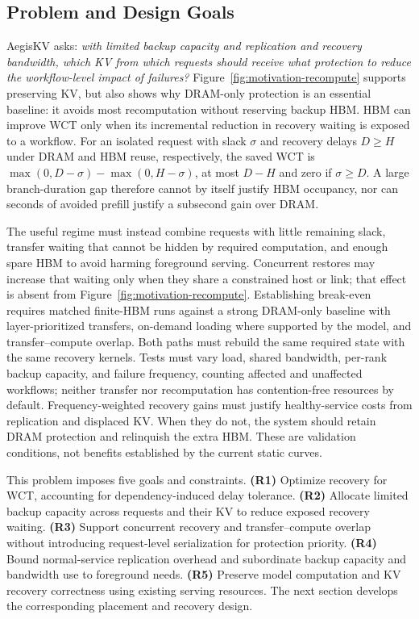 \subsection{Problem and Design Goals}
\label{sec:motivation-goals}

AegisKV asks: \emph{with limited backup capacity and replication and
recovery bandwidth, which KV from which requests should receive what
protection to reduce the workflow-level impact of failures?}
Figure~\ref{fig:motivation-recompute} supports preserving KV, but also
shows why DRAM-only protection is an essential baseline: it avoids most
recomputation without reserving backup HBM. HBM can improve WCT only when
its incremental reduction in recovery waiting is exposed to a workflow.
For an isolated request with slack $\sigma$ and recovery delays
$D\geq H$ under DRAM and HBM reuse, respectively, the saved WCT is
$\max(0,D-\sigma)-\max(0,H-\sigma)$, at most $D-H$ and zero if
$\sigma\geq D$. A large branch-duration gap therefore cannot by itself
justify HBM occupancy, nor can seconds of avoided prefill justify a
subsecond gain over DRAM.

The useful regime must instead combine requests with little remaining
slack, transfer waiting that cannot be hidden by required computation,
and enough spare HBM to avoid harming foreground serving. Concurrent
restores may increase that waiting only when they share a constrained
host or link; that effect is absent from Figure~\ref{fig:motivation-recompute}.
Establishing break-even requires matched finite-HBM runs against a strong
DRAM-only baseline with layer-prioritized transfers, on-demand loading
where supported by the model, and transfer--compute overlap. Both paths
must rebuild the same required state with the same recovery kernels.
Tests must vary load, shared bandwidth, per-rank backup capacity, and
failure frequency, counting affected and unaffected workflows; neither
transfer nor recomputation has contention-free resources by default.
Frequency-weighted recovery gains
must justify healthy-service costs from replication and displaced KV.
When they do not, the system should retain DRAM protection and relinquish
the extra HBM. These are validation conditions, not benefits established
by the current static curves.

This problem imposes five goals and constraints.
\textbf{(R1)} Optimize recovery for WCT, accounting for dependency-induced
delay tolerance.
\textbf{(R2)} Allocate limited backup capacity across requests and their
KV to reduce exposed recovery waiting.
\textbf{(R3)} Support concurrent recovery and transfer--compute overlap
without introducing request-level serialization for protection priority.
\textbf{(R4)} Bound normal-service replication overhead and subordinate
backup capacity and bandwidth use to foreground needs.
\textbf{(R5)} Preserve model computation and KV recovery correctness using
existing serving resources.
The next section develops the corresponding placement and recovery design.
